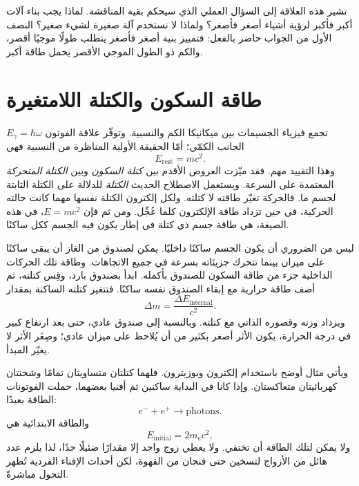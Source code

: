 تشير هذه العلاقة إلى السؤال العملي الذي سيحكم بقية المناقشة. لماذا يجب بناء آلات أكبر فأكبر لرؤية أشياء أصغر فأصغر؟ ولماذا لا نستخدم آلة صغيرة لشيء صغير؟ النصف الأول من الجواب حاضر بالفعل: فتمييز بنية أصغر فأصغر يتطلب طولًا موجيًا أقصر، والكم ذو الطول الموجي الأقصر يحمل طاقة أكبر.

\section{طاقة السكون والكتلة اللامتغيرة}

تجمع فيزياء الجسيمات بين ميكانيكا الكم والنسبية. وتوفّر علاقة الفوتون \(E_\gamma=\hbar\omega\) الجانب الكمّي؛ أمّا الحقيقة الأولية المناظرة من النسبية فهي
\begin{equation}
E_{\mathrm{rest}}=mc^2.
\end{equation}
وهذا التقييد مهم. فقد ميّزت العروض الأقدم بين \emph{كتلة السكون} وبين \emph{الكتلة المتحركة} المعتمدة على السرعة. ويستعمل الاصطلاح الحديث \emph{الكتلة} للدلالة على الكتلة الثابتة لجسم ما. فالحركة تغيّر طاقته لا كتلته. ولكل إلكترون الكتلة نفسها مهما كانت حالته الحركية، في حين تزداد طاقة الإلكترون كلما عُجِّل. ومن ثم فإن \(E=mc^2\)، في هذه الصيغة، هي طاقة جسم ذي كتلة في إطار يكون فيه الجسم ككل ساكنًا.

ليس من الضروري أن يكون الجسم ساكنًا داخليًا. يمكن لصندوق من الغاز أن يبقى ساكنًا على ميزان بينما تتحرك جزيئاته بسرعة في جميع الاتجاهات. وطاقة تلك الحركات الداخلية جزء من طاقة السكون للصندوق بأكمله. ابدأ بصندوق بارد، وقِس كتلته، ثم أضف طاقة حرارية مع إبقاء الصندوق نفسه ساكنًا. فتتغير كتلته الساكنة بمقدار
\begin{equation}
\Delta m=\frac{\Delta E_{\mathrm{internal}}}{c^2}.
\end{equation}
ويزداد وزنه وقصوره الذاتي مع كتلته. وبالنسبة إلى صندوق عادي، حتى بعد ارتفاع كبير في درجة الحرارة، يكون الأثر أصغر بكثير من أن يُلاحظ على ميزان عادي؛ وصِغَر الأثر لا يغيّر المبدأ.

ويأتي مثال أوضح باستخدام إلكترون وبوزيترون. فلهما كتلتان متساويتان تمامًا وشحنتان كهربائيتان متعاكستان. وإذا كانا في البداية ساكنين ثم أفنيا بعضهما، حملت الفوتونات الطاقة بعيدًا:
\begin{equation}
e^-+e^+\longrightarrow \text{photons}.
\end{equation}
والطاقة الابتدائية هي
\begin{equation}
E_{\mathrm{initial}}=2m_e c^2,
\end{equation}
ولا يمكن لتلك الطاقة أن تختفي. ولا يعطي زوج واحد إلا مقدارًا ضئيلًا جدًا، لذا يلزم عدد هائل من الأزواج لتسخين حتى فنجان من القهوة، لكن أحداث الإفناء الفردية تُظهر التحول مباشرةً.

